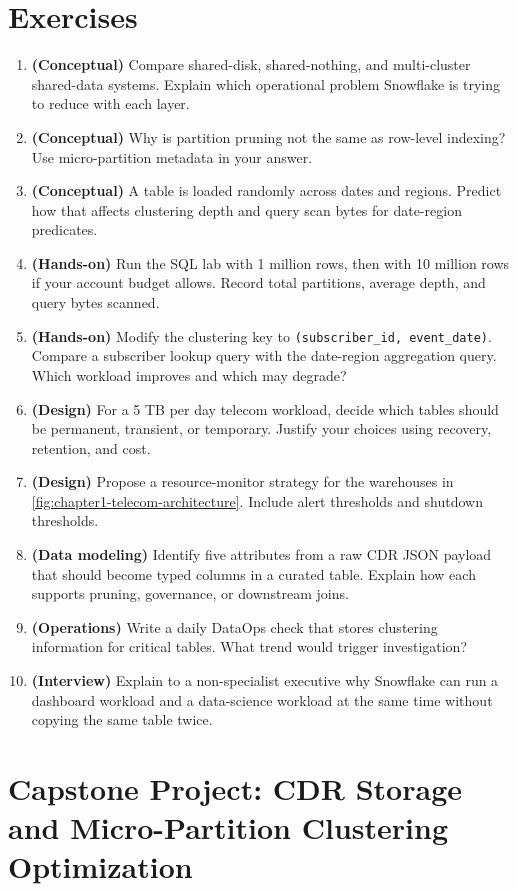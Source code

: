 \section{Exercises}
\begin{enumerate}
    \item \textbf{(Conceptual)} Compare shared-disk, shared-nothing, and multi-cluster shared-data systems. Explain which operational problem Snowflake is trying to reduce with each layer.
    \item \textbf{(Conceptual)} Why is partition pruning not the same as row-level indexing? Use micro-partition metadata in your answer.
    \item \textbf{(Conceptual)} A table is loaded randomly across dates and regions. Predict how that affects clustering depth and query scan bytes for date-region predicates.
    \item \textbf{(Hands-on)} Run the SQL lab with 1 million rows, then with 10 million rows if your account budget allows. Record total partitions, average depth, and query bytes scanned.
    \item \textbf{(Hands-on)} Modify the clustering key to \texttt{(subscriber\_id, event\_date)}. Compare a subscriber lookup query with the date-region aggregation query. Which workload improves and which may degrade?
    \item \textbf{(Design)} For a 5 TB per day telecom workload, decide which tables should be permanent, transient, or temporary. Justify your choices using recovery, retention, and cost.
    \item \textbf{(Design)} Propose a resource-monitor strategy for the warehouses in \cref{fig:chapter1-telecom-architecture}. Include alert thresholds and shutdown thresholds.
    \item \textbf{(Data modeling)} Identify five attributes from a raw CDR JSON payload that should become typed columns in a curated table. Explain how each supports pruning, governance, or downstream joins.
    \item \textbf{(Operations)} Write a daily DataOps check that stores clustering information for critical tables. What trend would trigger investigation?
    \item \textbf{(Interview)} Explain to a non-specialist executive why Snowflake can run a dashboard workload and a data-science workload at the same time without copying the same table twice.
\end{enumerate}

\section{Capstone Project: CDR Storage and Micro-Partition Clustering Optimization}\label{sec:ch1-capstone}

